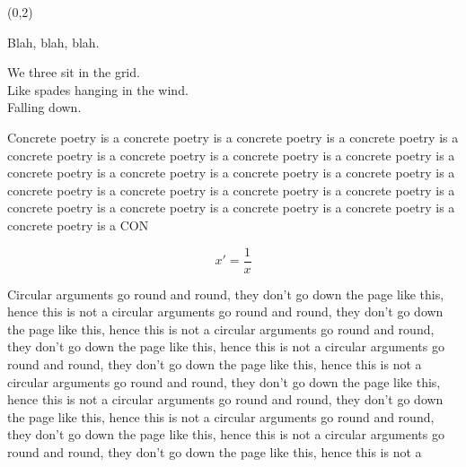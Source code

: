 \documentclass[a0,portrait]{a0poster}
\def\LHead#1{\noindent{\LARGE\color{DarkBlue} #1}\smallskip}
\begin{document}
\begin{textblock}{7}(0,2)
  \LHead{Introduction}
  
  Blah, blah, blah.

  We three sit in the grid.\\
  Like spades hanging in the wind.\\
  Falling down.

  Concrete poetry is a concrete poetry is a concrete poetry is a 
  concrete poetry is a concrete poetry is a concrete poetry is a 
  concrete poetry is a concrete poetry is a concrete poetry is a 
  concrete poetry is a concrete poetry is a concrete poetry is a 
  concrete poetry is a concrete poetry is a concrete poetry is a 
  concrete poetry is a concrete poetry is a concrete poetry is a 
  concrete poetry is a concrete poetry is a concrete poetry is a 
  CON

  \[
  x' = \frac{1}{x}
  \]

  Circular arguments go round and round, they don't go down the page
  like this, hence this is not a circular arguments go round and round, they don't go down the page
  like this, hence this is not a circular arguments go round and round, they don't go down the page
  like this, hence this is not a circular arguments go round and round, they don't go down the page
  like this, hence this is not a circular arguments go round and round, they don't go down the page
  like this, hence this is not a circular arguments go round and round, they don't go down the page
  like this, hence this is not a circular arguments go round and round, they don't go down the page
  like this, hence this is not a circular arguments go round and round, they don't go down the page
  like this, hence this is not a 

\end{textblock}
\end{document}
